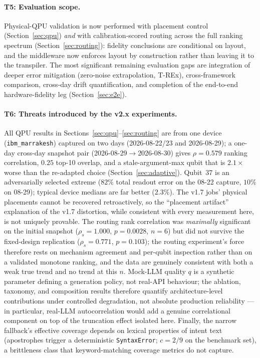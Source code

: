 ﻿\documentclass[12pt,a4paper]{article}
\begin{document}
\paragraph{T5: Evaluation scope.} Physical-QPU validation is now performed with placement control (Section~\ref{sec:qpu}) \emph{and} with calibration-scored routing across the full ranking spectrum (Section~\ref{sec:routing}): fidelity conclusions are conditional on layout, and the middleware now enforces layout by construction rather than leaving it to the transpiler. The most significant remaining evaluation gaps are integration of deeper error mitigation (zero-noise extrapolation, T-REx), cross-framework comparison, cross-day drift quantification, and completion of the end-to-end hardware-fidelity leg (Section~\ref{sec:e2e}).

\paragraph{T6: Threats introduced by the v2.x experiments.} All QPU results in Sections~\ref{sec:qpu}--\ref{sec:routing} are from one device (\texttt{ibm\_marrakesh}) captured on two days (2026-08-22/23 and 2026-08-29); a one-day cross-day snapshot pair (2026-08-29$\to$2026-08-30) gives $\rho{=}0.579$ ranking correlation, $0.25$ top-10 overlap, and a stale-argument-max qubit that is $2.1\times$ worse than the re-adapted choice (Section~\ref{sec:adaptive}). Qubit~37 is an adversarially selected extreme ($82\%$ total readout error on the 08-22 capture, $10\%$ on 08-29); typical device medians are far better ($2.3\%$). The v1.7 jobs' physical placements cannot be recovered retroactively, so the ``placement artifact'' explanation of the v1.7 distortion, while consistent with every measurement here, is not uniquely provable. The routing rank correlation was \emph{maximally} significant on the initial snapshot ($\rho_s = 1.000$, $p = 0.0028$, $n{=}6$) but did not survive the fixed-design replication ($\rho_s = 0.771$, $p = 0.103$); the routing experiment's force therefore rests on mechanism agreement and per-qubit inspection rather than on a validated monotone ranking, and the data are genuinely consistent with both a weak true trend and no trend at this $n$. Mock-LLM quality $q$ is a synthetic parameter defining a generation policy, not real-API behaviour; the ablation, taxonomy, and composition results therefore quantify architecture-level contributions under controlled degradation, not absolute production reliability --- in particular, real-LLM autocorrelation would add a genuine correlational component on top of the truncation effect isolated here. Finally, the narrow fallback's effective coverage depends on lexical properties of intent text (apostrophes trigger a deterministic \texttt{SyntaxError}; $c = 2/9$ on the benchmark set), a brittleness class that keyword-matching coverage metrics do not capture.
\end{document}

